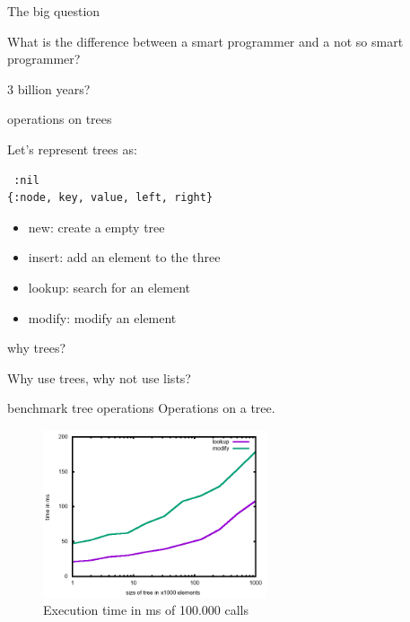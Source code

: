 \begin{frame}{The big question}

What is the difference between a smart programmer and a not so smart programmer?

\vspace{60pt}
\pause \centerline{3 billion years?}

\end{frame}

\begin{frame}[fragile]{operations on trees}

  Let's represent trees as:
  \vspace{10pt}
  
\begin{verbatim}
 :nil
{:node, key, value, left, right}
\end{verbatim}

\pause \vspace{20pt}
\begin{itemize}
\item new: create a empty tree
\item insert: add an element to the three
\item lookup: search for an element 
\item modify: modify an element
\end{itemize}

\end{frame}

\begin{frame}{why trees?}

Why use trees, why not use lists?

\end{frame}

\begin{frame}{benchmark tree operations}
 Operations on a tree.
 \begin{figure}
  \centering
  \includegraphics[height=140pt]{tree.png}
  \caption{Execution time in ms of 100.000 calls}
 \end{figure}

\end{frame}

